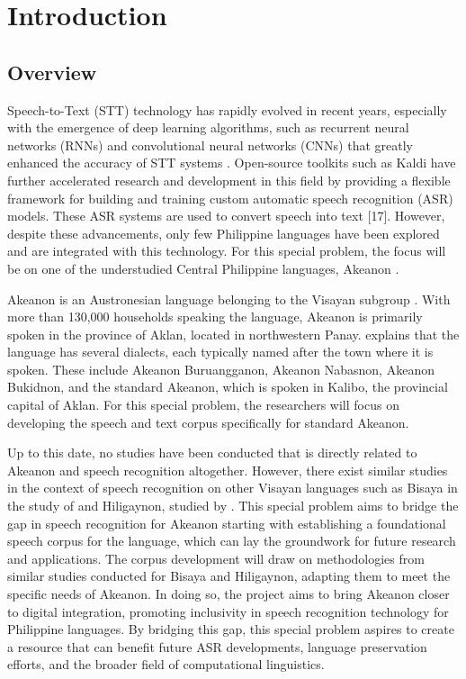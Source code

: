 \chapter{Introduction}
\label{sec:researchdesc}    %

\section{Overview}
\label{sec:overview}

Speech-to-Text (STT) technology has rapidly evolved in recent years, especially with the emergence of deep learning algorithms, such as recurrent neural networks (RNNs) and convolutional neural networks (CNNs) that greatly enhanced the accuracy of STT systems \cite{Televic:2024}. Open-source toolkits such as Kaldi have further accelerated research and development in this field by providing a flexible framework for building and training custom automatic speech recognition (ASR) models. These ASR systems are used to convert speech into text [17]. However, despite these advancements, only few Philippine languages have been explored and are integrated with this technology. For this special problem, the focus will be on one of the understudied Central Philippine languages, Akeanon \cite{Wellstood:2022}. 

Akeanon is an Austronesian language belonging to the Visayan subgroup \cite{Biray:2023}. With more than 130,000 households \cite{PSA:2023} speaking the language, Akeanon is primarily spoken in the province of Aklan, located in northwestern Panay.  explains that the language has several dialects, each typically named after the town where it is spoken. These include Akeanon Buruangganon, Akeanon Nabasnon, Akeanon Bukidnon, and the standard Akeanon, which is spoken in Kalibo, the provincial capital of Aklan. For this special problem, the researchers will focus on developing the speech and text corpus specifically for standard Akeanon.

Up to this date, no studies have been conducted that is directly related to Akeanon and speech recognition altogether. However, there exist similar studies in the context of speech recognition on other Visayan languages such as Bisaya in the study of  and Hiligaynon, studied by . This special problem aims to bridge the gap in speech recognition for Akeanon starting with establishing a foundational speech corpus for the language, which can lay the groundwork for future research and applications. The corpus development will draw on methodologies from similar studies conducted for Bisaya and Hiligaynon, adapting them to meet the specific needs of Akeanon. In doing so, the project aims to bring Akeanon closer to digital integration, promoting inclusivity in speech recognition technology for Philippine languages. By bridging this gap, this special problem aspires to create a resource that can benefit future ASR developments, language preservation efforts, and the broader field of computational linguistics.

